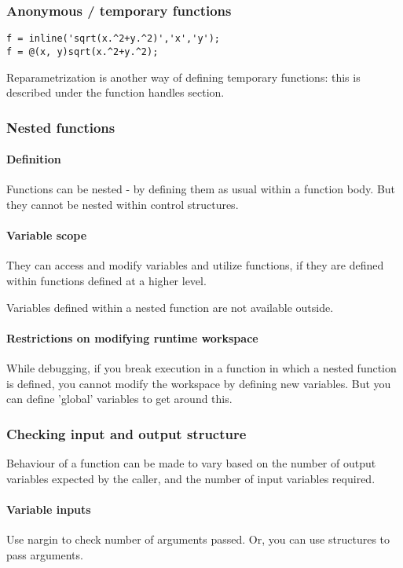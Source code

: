 \subsubsection{Anonymous / temporary functions}
\begin{lstlisting}
f = inline('sqrt(x.^2+y.^2)','x','y');
f = @(x, y)sqrt(x.^2+y.^2);
\end{lstlisting}

Reparametrization is another way of defining temporary functions: this is described under the function handles section.

\subsubsection{Nested functions}
\paragraph{Definition}
Functions can be nested - by defining them as usual within a function body. But they cannot be nested within control structures.

\paragraph{Variable scope}
They can access and modify variables and utilize functions, if they are defined within functions defined at a higher level.

Variables defined within a nested function are not available outside.

\paragraph{Restrictions on modifying runtime workspace}
While debugging, if you break execution in a function in which a nested function is defined, you cannot modify the workspace by defining new variables. But you can define 'global' variables to get around this.

\subsubsection{Checking input and output structure}
Behaviour of a function can be made to vary based on the number of output variables expected by the caller, and the number of input variables required.

\paragraph*{Variable inputs}
Use nargin to check number of arguments passed. Or, you can use structures to pass arguments.


